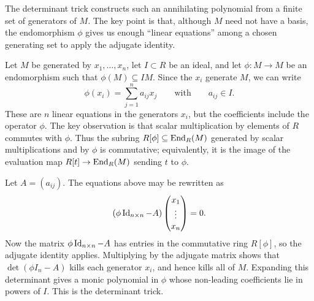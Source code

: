 \documentclass[12pt,reqno]{amsart}
\begin{document}
The determinant trick constructs such an annihilating polynomial from a finite set of generators of $M$. The key point is that, although $M$ need not have a
basis, the endomorphism $\phi$ gives us enough ``linear equations'' among a chosen generating set to apply the adjugate identity.

Let $M$ be generated by $x_1,\ldots,x_n$, let $I\subset R$ be an ideal, and let $\phi:M\to M$ be an endomorphism such that $\phi(M)\subseteq IM$. Since the $x_i$ generate $M$, we can write
\[
\phi(x_i)=\sum_{j=1}^n a_{ij}x_j
\qquad\text{with}\qquad a_{ij}\in I.
\]
These are $n$ linear equations in the generators $x_i$, but the coefficients include the operator $\phi$. The key observation is that scalar multiplication by elements of $R$ commutes with $\phi$. Thus the subring $R[\phi]\subseteq \operatorname{End}_R(M)$ generated by scalar multiplications and by $\phi$ is commutative; equivalently, it is the image of the evaluation map $R[t]\to \operatorname{End}_R(M)$ sending $t$ to $\phi$.

Let $A=(a_{ij})$. The equations above may be rewritten as
\[
(\phi \operatorname{Id}_{n\times n}-A)
\begin{pmatrix}
 x_1\\ \vdots \\ x_n
\end{pmatrix}=0.
\]
Now the matrix $\phi \operatorname{Id}_{n\times n}-A$ has entries in the commutative ring $R[\phi]$, so the adjugate identity applies. Multiplying by the adjugate matrix shows that $\det(\phi I_n-A)$ kills each generator $x_i$, and hence kills all of $M$. Expanding this determinant gives a monic polynomial in $\phi$ whose non-leading coefficients lie in powers of $I$. This is the determinant trick.


\hrulefill
\end{document}
